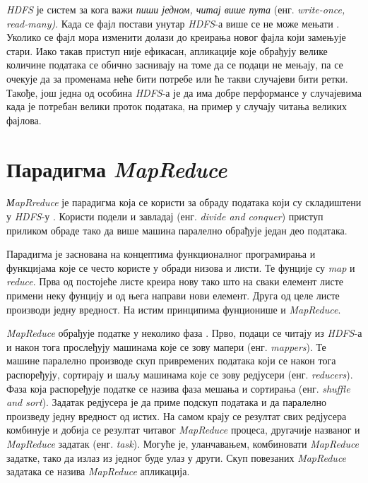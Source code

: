 \documentclass[12pt,oneside]{memoir}
\begin{document}
\textit{HDFS} је систем за кога важи \textit{пиши једном, читај више пута} (енг. \textit{write-once, read-many)}. Када се фајл постави унутар \textit{HDFS}-а више се не може мењати \cite{hadoop_beginner}. Уколико се фајл мора изменити долази до креирања новог фајла који замењује стари. Иако такав приступ није ефикасан, апликације које обрађују велике количине података се обично заснивају на томе да се подаци не мењају, па се очекује да за променама неће бити потребе или ће такви случајеви бити ретки. Такође, још једна од особина \textit{HDFS}-а је да има добре перформансе у случајевима када је потребан велики проток података, на пример у случају читања великих фајлова.


\section{Парадигма \textit{MapReduce}}
\label{sec:mr}

\textit{МapRreduce} је парадигма која се користи за обраду података који су складиштени у \textit{HDFS}-у \cite{hadoop_beginner}. Користи подели и завладај (енг. \textit{divide and conquer}) приступ приликом обраде тако да више машина паралелно обрађује један део података.

Парадигма је заснована на концептима функционалног програмирања и функцијама које се често користе у обради низова и листи. Те фунције су \textit{map} и \textit{reduce}. Прва од постојеће листе креира нову тако што на сваки елемент листе примени неку фунцију и од њега направи нови елемент. Друга од целе листе производи једну вредност. На истим принципима фунционише и \textit{MapReduce}.

\textit{MapReduce} обрађује податке у неколико фаза \cite{hadoop_learning}. Прво, подаци се читају из \textit{HDFS}-а и након тога прослеђују машинама које се зову мапери (енг. \textit{mappers}). Те машине паралелно производе скуп привремених података који се након тога распоређују, сортирају и шаљу машинама које се зову редјусери (енг. \textit{reducers}). Фаза која распоређује податке се назива фаза мешања и сортирања (енг. \textit{shuffle and sort}). Задатак редјусера је да приме подскуп података и да паралелно произведу једну вредност од истих. На самом крају се резултат свих редјусера комбинује и добија се резултат читавог \textit{MapReduce} процеса, другачије названог и \textit{MapReduce} задатак (енг. \textit{task}). Могуће је, уланчавањем, комбиновати \textit{MapReduce} задатке, тако да излаз из једног буде улаз у други. Скуп повезаних \textit{MapReduce} задатака се назива \textit{MapReduce} апликација.
\end{document}
